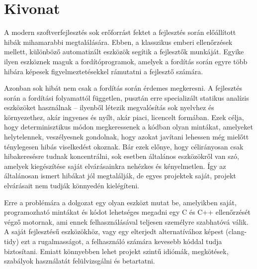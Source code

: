 \setcounter{page}{1}

\selecthungarian

\chapter*{Kivonat}

A modern szoftverfejlesztés sok erőforrást fektet a fejlesztés során előállított hibák mihamarabbi megtalálására.
Ebben, a klasszikus emberi ellenőrzések mellett, különböző automatizált eszközök segítik a fejlesztők munkáját.
Egyike ilyen eszköznek maguk a fordítóprogramok, amelyek a fordítás során egyre több hibára képesek figyelmeztetésekkel rámutatni a fejlesztő számára.

Azonban sok hibát nem csak a fordítás során érdemes megkeresni.
A fejlesztés során a fordítási folyamattól független, pusztán erre specializált \un statikus analízis eszközöket használnak – ilyenből létezik megvalósítás sok nyelvhez és környezethez, akár ingyenes és nyílt, akár piaci, licencelt formában.
Ezek célja, hogy determinisztikus módon megkeressenek a kódban olyan mintákat, amelyeket helytelennek, veszélyesnek gondolnak, hogy azokat javítani lehessen még mielőtt ténylegesen hibás viselkedést okoznak.
Bár ezek előnye, hogy célirányosan csak hibakeresésre tudnak koncentrálni, sok esetben általános eszközökről van szó, amelyek kiegészítése saját elvárásainkra nehézkes és kényelmetlen.
Így az általánosan ismert hibákat jól megtalálják, de egyes projektek saját, projekt elvárásait nem tudják könnyedén kielégíteni.

Erre a problémára a dolgozat egy olyan eszközt mutat be, amelyikben saját, programozható mintákat és kódot lehetséges megadni egy C és C++ ellenőrzését végző motornak, ami ennek felhasználásával teljesen személyre szabhatóvá válik.
A saját fejlesztésű eszközökhöz, vagy egy elterjedt alternatívához képest (clang-tidy) ezt a rugalmasságot, a felhasználó számára kevesebb kóddal tudja biztosítani.
Emiatt könnyebben lehet projekt szintű idiómák, megkötések, szabályok használatát felülvizsgálni és betartatni.

\vfill
\selectenglish



